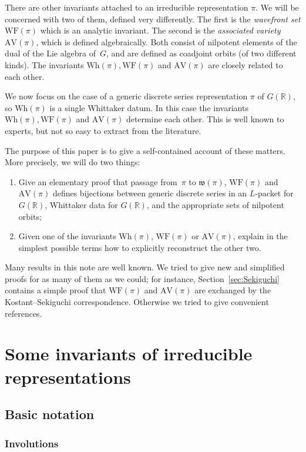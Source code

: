 \documentclass[10pt,leqno]{article}
\numberwithin{equation}{section}
\newcommand{\R}{\mathbb R}
\newcommand{\AV}{\mathrm{AV}}
\newcommand{\Wh}{\mathrm{Wh}}
\newcommand{\WF}{\mathrm{WF}}
\begin{document}
There are other invariants attached to an
irreducible representation $\pi$.  We will be concerned with two of
them, defined very differently. The first is the \emph{wavefront set} $\WF(\pi)$
which is an analytic invariant.
The second is the \emph{associated variety} $\AV(\pi)$, which is
defined  algebraically.
Both consist of nilpotent elements of the dual of the Lie algebra of~$G$, and are defined as
coadjoint orbits (of two different kinds).
The invariants $\Wh(\pi), \WF(\pi)$ and $\AV(\pi)$ are closely related to each other.

We now focus on the case of a generic discrete series representation
$\pi$ of $G(\R)$, so $\Wh(\pi)$ is a single Whittaker datum.  In this
case the invariants $\Wh(\pi), \WF(\pi)$ and $\AV(\pi)$ determine each
other. This is well known to experts, but not so easy to extract
from the literature. 

The purpose
of this paper is to give a self-contained account of these matters. More precisely, we will do two things:
\begin{enumerate}
\item Give an elementary proof that  passage from~$\pi$ to $\mathfrak{w}(\pi)$, $\WF(\pi)$ and $\AV(\pi)$ defines bijections between generic discrete series in an $L$-packet for $G(\R)$, Whittaker data for $G(\R)$, and the appropriate sets of nilpotent orbits;
\item Given one of the invariants $\Wh(\pi)$, $\WF(\pi)$ or $\AV(\pi)$, explain in the simplest possible terms how to explicitly reconstruct the other two.
\end{enumerate}
Many results in this note are well known. We  tried to give new and simplified proofs for as many of them as we could; for instance, Section~\ref{sec:Sekiguchi} contains a simple proof that $\WF(\pi)$ and $\AV(\pi)$ are exchanged by the Kostant--Sekiguchi correspondence. Otherwise we tried to give convenient references.

\section{Some invariants of irreducible representations}

\subsection{Basic notation}

\subsubsection*{Involutions} 
\end{document}
